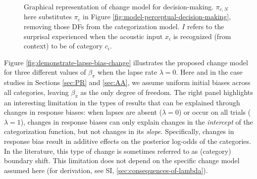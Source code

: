 \documentclass[
  11pt,
  man,floatsintext]{apa6}
\begin{document}
\begin{figure}
\centering
\caption{Graphical representation of change model for decision-making. $\pi_{c,N}$ here substitutes $\pi_c$ in Figure \ref{fig:model-perceptual-decision-making}, removing those DFs from the categorization model. $I$ refers to the surprisal experienced when the acoustic input $x_i$ is recognized (from context) to be of category $c_i$.\label{fig:graphical-model-changes-decision-making}}
\end{figure}

Figure \ref{fig:demonstrate-lapse-bias-change} illustrates the proposed change model for three different values of \(\beta_{\pi}\) when the lapse rate \(\lambda=0\). Here and in the case studies in Sections \ref{sec:PR} and \ref{sec:AA}, we assume uniform initial biases across all categories, leaving \(\beta_{\pi}\) as the only degree of freedom. The right panel highlights an interesting limitation in the types of results that can be explained through changes in response biases: when lapses are absent (\(\lambda=0\)) or occur on all trials (\(\lambda=1\)), changes in response biases can only explain changes in the \emph{intercept} of the categorization function, but not changes in its \emph{slope}. Specifically, changes in response bias result in additive effects on the posterior log-odds of the categories. In the literature, this type of change is sometimes referred to as (category) boundary shift. This limitation does not depend on the specific change model assumed here (for derivation, see SI, \ref{sec:consequences-of-lambda}).
\end{document}
